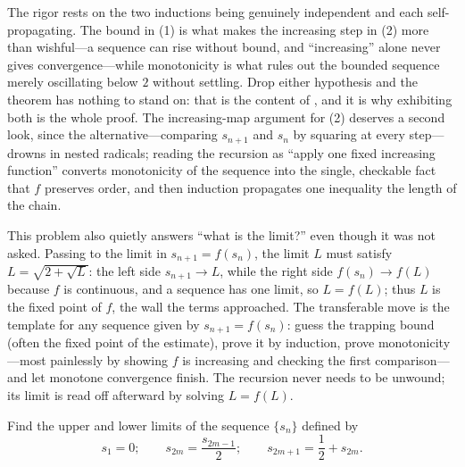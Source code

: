 \documentclass[main.tex]{subfiles}
\begin{document}
\begin{Reflection}
The rigor rests on the two inductions being genuinely independent and each self-propagating. The bound
in (1) is what makes the increasing step in (2) more than wishful---a sequence can rise without bound,
and ``increasing'' alone never gives convergence---while monotonicity is what rules out the bounded
sequence merely oscillating below $2$ without settling. Drop either hypothesis and the theorem has
nothing to stand on: that is the content of , and it is why exhibiting both is the whole
proof. The increasing-map argument for (2) deserves a second look, since the alternative---comparing
$s_{n+1}$ and $s_{n}$ by squaring at every step---drowns in nested radicals; reading the recursion as
``apply one fixed increasing function'' converts monotonicity of the sequence into the single, checkable
fact that $f$ preserves order, and then induction propagates one inequality the length of the chain.

This problem also quietly answers ``what is the limit?'' even though it was not asked. Passing to the
limit in $s_{n+1}=f(s_{n})$, the limit $L$ must satisfy $L=\sqrt{2+\sqrt L}$: the left side
$s_{n+1}\to L$, while the right side $f(s_{n})\to f(L)$ because $f$ is continuous, and a sequence has
one limit, so $L=f(L)$; thus $L$ is the fixed point of $f$, the wall the terms approached. The transferable move is the template for any
sequence given by $s_{n+1}=f(s_{n})$: guess the trapping bound (often the fixed point of the
estimate), prove it by induction, prove monotonicity---most painlessly by showing $f$ is increasing
and checking the first comparison---and let monotone convergence finish. The recursion never needs to
be unwound; its limit is read off afterward by solving $L=f(L)$.
\end{Reflection}

Find the upper and lower limits of the sequence $\{s_{n}\}$ defined by
\[
s_{1} = 0; \qquad s_{2m} = \frac{s_{2m-1}}{2}; \qquad s_{2m+1} = \frac{1}{2} + s_{2m}.
\]
\end{document}
